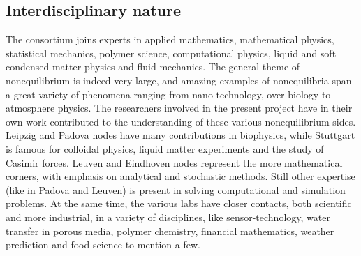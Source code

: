 \subsection{Interdisciplinary nature}\label{sec:interdisc}


The consortium joins experts in applied mathematics, mathematical physics, statistical mechanics, polymer science, computational physics, liquid and soft condensed matter physics and fluid mechanics.
The general theme of nonequilibrium is indeed very  large, and amazing examples of nonequilibria span a great variety of phenomena ranging from nano-technology, over biology to atmosphere physics.
The researchers involved in the present project have in their own work contributed to the understanding of these various nonequilibrium sides.  Leipzig and Padova nodes have many contributions in biophysics, while Stuttgart is famous for colloidal physics, liquid matter experiments and the study of Casimir forces.  Leuven and Eindhoven nodes represent the more mathematical corners, with emphasis on analytical and stochastic methods.  Still other expertise (like in Padova and Leuven) is present in solving computational and simulation problems.   At the same time, the various labs have closer contacts, both scientific and more industrial, in a variety of disciplines, like sensor-technology, water transfer in porous media, polymer chemistry, financial mathematics, weather prediction and food science to mention a few.


